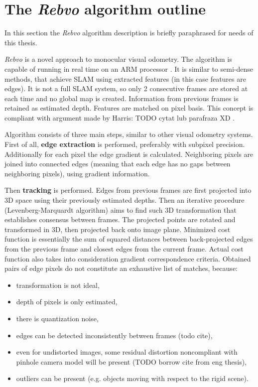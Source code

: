 
\section{The \textit{Rebvo} algorithm outline}

In this section the \textit{Rebvo} algorithm \cite{jose2015realtime} description is briefly paraphrased for needs of this thesis.

\textit{Rebvo} is a novel approach to monocular visual odometry. The algorithm is capable of running in real time on an ARM processor \cite{jose2015realtime}. It is similar to semi-dense methods, that achieve SLAM using extracted features (in this case features are edges). It is not a full SLAM system, so only 2 consecutive frames are stored at each time and no global map is created. Information from previous frames is retained as estimated depth. Features are matched on pixel basis. This concept is compliant with argument made by Harris: TODO cytat lub parafraza XD \cite{harris}.

Algorithm consists of three main steps, similar to other visual odometry systems. First of all, \textbf{edge extraction} is performed, preferably with subpixel precision. Additionally for each pixel the edge gradient is calculated. Neighboring pixels are joined into connected edges (meaning that each edge has no gaps between neighboring pixels), using gradient information.

Then \textbf{tracking} is performed. Edges from previous frames are first projected into 3D space using their previously estimated depths. Then an iterative procedure (Levenberg-Marquardt algorithm) aims to find such 3D transformation that establishes consensus between frames. The projected points are rotated and transformed in 3D, then projected back onto image plane. Minimized cost function is essentially the sum of squared distances between back-projected edges from the previous frame and closest edges from the current frame. Actual cost function also takes into consideration gradient correspondence criteria. Obtained pairs of edge pixels do not constitute an exhaustive list of matches, because:
\begin{itemize}
\item transformation is not ideal,
\item depth of pixels is only estimated,
\item there is quantization noise,
\item edges can be detected inconsistently between frames (todo cite),
\item even for undistorted images, some residual distortion noncompliant with pinhole camera model will be present (TODO borrow cite from eng thesis),
\item outliers can be present (e.g. objects moving with respect to the rigid scene).
\end{itemize}
 
